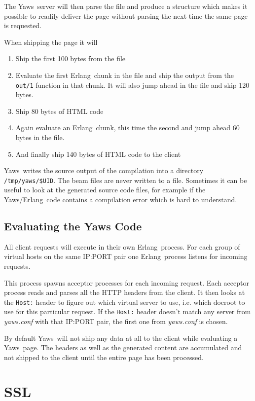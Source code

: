 \documentclass[11pt,oneside,english]{book}
\newcommand{\Erlang}            %
        {{\sc Erlang}}
\newcommand{\Yaws}            %
        {{\sc Yaws}}
\begin{document}
The \Yaws\ server will then parse the file and produce a structure
which makes it possible to readily deliver the page without parsing
the next time the same page is requested.

When shipping the page it will
\begin{enumerate}
\item Ship the first 100 bytes from the file
\item Evaluate the first \Erlang\  chunk in the file and ship the output
from the \verb+out/1+ function in that chunk. It will also jump ahead
in the file and skip 120 bytes.
\item Ship 80 bytes of HTML code
\item Again evaluate an \Erlang\  chunk, this time the second and jump
ahead 60 bytes in the file.
\item And finally ship 140 bytes of HTML code to the client
\end{enumerate}

\Yaws\ writes the source output of the compilation into a directory
\verb+/tmp/yaws/$UID+. The beam files are never written to a file.
Sometimes it can be useful to look at the generated source code files,
for example if the \Yaws{}\slash \Erlang\ code contains a compilation
error which is hard to understand.


\section{Evaluating the Yaws Code}

All client requests will execute in their own \Erlang\  process.
For each group of virtual hosts on the same IP:PORT pair
one \Erlang\  process listens for incoming requests.

This process spawns acceptor processes for each incoming request.
Each acceptor process reads and parses all the HTTP headers from the
client. It then looks at the \verb+Host:+ header to figure out which
virtual server to use, i.e. which docroot to use for this particular
request. If the \verb+Host:+ header doesn't match any server from
\textit{yaws.conf} with that IP:PORT pair, the first one from
\textit{yaws.conf} is chosen.

By default \Yaws\  will not ship any data at all to the client
while evaluating a \Yaws\  page. The headers as well as the generated
content are accumulated and not shipped to the client until the
entire page has been processed.


\chapter{SSL}
\end{document}
